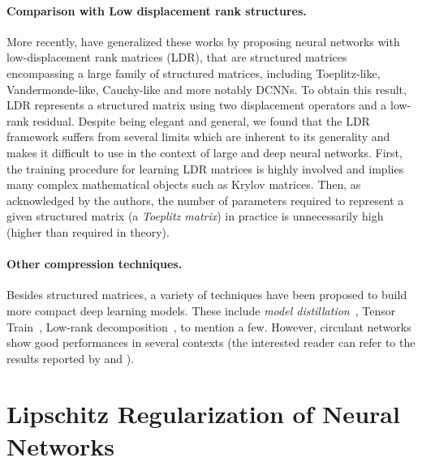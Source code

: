 \paragraph{Comparison with Low displacement rank structures.}
More recently, \citet{Thomas_NIPS2018_8119} have generalized these works by proposing neural networks with low-displacement rank matrices (LDR), that are structured matrices encompassing a large family of structured matrices, including Toeplitz-like, Vandermonde-like, Cauchy-like and more notably DCNNs.
To obtain this result, LDR represents a structured matrix using two displacement operators and a low-rank residual.
Despite being elegant and general, we found that the LDR framework suffers from several limits which are inherent to its generality and makes it difficult to use in the context of large and deep neural networks.
First, the training procedure for learning LDR matrices is highly involved and implies many complex mathematical objects such as Krylov matrices.
Then, as acknowledged by the authors, the number of parameters required to represent a given structured matrix (a \emph{Toeplitz matrix}) in practice is unnecessarily high (higher than required in theory). 

\paragraph{Other compression techniques.}
Besides structured matrices, a variety of techniques have been proposed to build more compact deep learning models.
These include \emph{model distillation}~\cite{44873}, Tensor Train~\cite{novikov2015tensorizing}, Low-rank decomposition~\cite{NIPS2013_5025}, to mention a few.
However, circulant networks show good performances in several contexts (the interested reader can refer to the results reported by \citet{moczulski2015acdc} and \citet{Thomas_NIPS2018_8119}).



\section{Lipschitz Regularization of Neural Networks}
\label{section:ch5-related_work}

